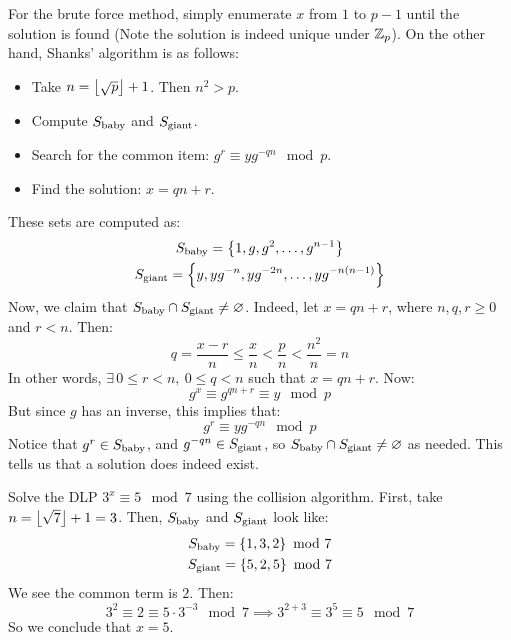 \documentclass{article}
\begin{document}
For the brute force method, simply enumerate $ x $ from $ 1 $ to $ p - 1 $
until the solution is found (Note the solution is indeed unique under $ \mathbb{Z}_{p} $).
On the other hand, Shanks' algorithm is as follows:
\begin{itemize}
    \item Take $ n = \left\lfloor{\sqrt{p}}\right\rfloor + 1 $. Then $ n^{2} > p $.
    \item Compute $ S_{\textrm{baby}} $ and $ S_{\textrm{giant}} $.
    \item Search for the common item: $ g^{r} \equiv yg^{-qn} \mod p $.
    \item Find the solution: $ x = qn + r $.
\end{itemize}
These sets are computed as:
\begin{gather*}
    S_{\textrm{baby}} = \left\{{1, g, g^{2}, \dots, g^{n-1}}\right\} \\
    S_{\textrm{giant}} = \left\{{y, yg^{-n}, yg^{-2n}, \dots, yg^{-n(n-1)}}\right\}
\end{gather*}
Now, we claim that $ S_{\textrm{baby}} \cap S_{\textrm{giant}} \neq \varnothing $. \vsp
%
Indeed, let $ x = qn + r $, where $ n, q, r \geq 0 $ and $ r < n $. Then:
\begin{equation*}
    q = \frac{x - r}{n} \leq \frac{x}{n} < \frac{p}{n} < \frac{n^{2}}{n} = n
\end{equation*}
In other words, $ \exists \, 0 \leq r < n, \ 0 \leq q < n $ such that $ x = qn + r $. Now:
\begin{equation*}
    g^{x} \equiv g^{qn + r} \equiv y \mod p
\end{equation*}
But since $ g $ has an inverse, this implies that:
\begin{equation*}
    g^{r} \equiv yg^{-qn} \mod p
\end{equation*}
Notice that $ g^{r} \in S_{\textrm{baby}} $, and $ g^{-qn} \in S_{\textrm{giant}} $,
so $ S_{\textrm{baby}} \cap S_{\textrm{giant}} \neq \varnothing $ as needed.
This tells us that a solution does indeed exist.

\begin{xmp}[source=Primary Source Material]
    Solve the DLP $ 3^{x} \equiv 5 \mod 7 $ using the collision algorithm. \vsp
    First, take $ n = \left\lfloor{\sqrt{7}}\right\rfloor + 1 = 3 $.
    Then, $ S_{\textrm{baby}} $ and $ S_{\textrm{giant}} $ look like:
    \begin{gather*}
        S_{\textrm{baby}} = \left\{{1, 3, 2}\right\} \ \mathrm{mod}\ 7 \\
        S_{\textrm{giant}} = \left\{{5, 2, 5}\right\} \ \mathrm{mod}\ 7
    \end{gather*}
    We see the common term is $ 2 $. Then:
    \begin{equation*}
        3^{2} \equiv 2 \equiv 5\cdot3^{-3} \mod 7 \implies 3^{2 + 3} \equiv 3^{5} \equiv 5 \mod 7
    \end{equation*}
    So we conclude that $ x = 5 $.
\end{xmp}
\end{document}
